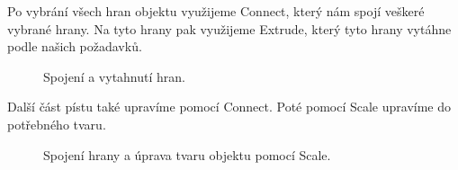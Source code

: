 \documentclass[12pt, a4paper,
twoside,        %
openright
]{report}
\begin{document}
\clearpage


Po vybrání všech hran objektu využijeme Connect, který nám spojí veškeré vybrané hrany. Na tyto hrany pak využijeme Extrude, který tyto hrany vytáhne podle našich požadavků.   

\begin{figure}[H]
	\centering
	\qquad
	\caption{Spojení a vytahnutí hran.}
	\label{fig:modelovani_cast4}
\end{figure}

Další část pístu také upravíme pomocí Connect. Poté pomocí Scale upravíme do potřebného tvaru. 

\begin{figure}[H]
	\centering
	\qquad
	\caption{Spojení hrany a úprava tvaru objektu pomocí Scale.}
	\label{fig:modelovani_cast5}
\end{figure}
\end{document}
